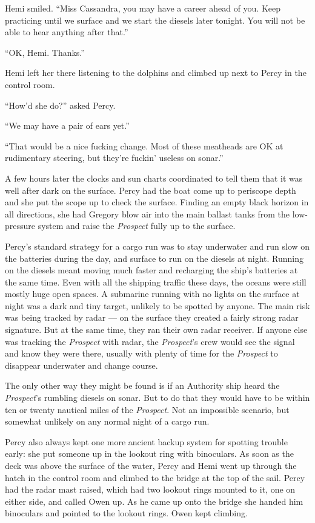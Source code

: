 \documentclass[
]{scrbook}
\begin{document}
Hemi smiled. ``Miss Cassandra, you may have a career ahead of you. Keep
practicing until we surface and we start the diesels later tonight. You
will not be able to hear anything after that.''

``OK, Hemi. Thanks.''

Hemi left her there listening to the dolphins and climbed up next to
Percy in the control room.

``How'd she do?'' asked Percy.

``We may have a pair of ears yet.''

``That would be a nice fucking change. Most of these meatheads are OK at
rudimentary steering, but they're fuckin' useless on sonar.''

\bigskip

A few hours later the clocks and sun charts coordinated to tell them
that it was well after dark on the surface. Percy had the boat come up
to periscope depth and she put the scope up to check the surface.
Finding an empty black horizon in all directions, she had Gregory blow
air into the main ballast tanks from the low-pressure system and raise
the \emph{Prospect} fully up to the surface.

Percy's standard strategy for a cargo run was to stay underwater and run
slow on the batteries during the day, and surface to run on the diesels
at night. Running on the diesels meant moving much faster and recharging
the ship's batteries at the same time. Even with all the shipping
traffic these days, the oceans were still mostly huge open spaces. A
submarine running with no lights on the surface at night was a dark and
tiny target, unlikely to be spotted by anyone. The main risk was being
tracked by radar --- on the surface they created a fairly strong radar
signature. But at the same time, they ran their own radar receiver. If
anyone else was tracking the \emph{Prospect} with radar, the
\emph{Prospect}'s crew would see the signal and know they were there,
usually with plenty of time for the \emph{Prospect} to disappear
underwater and change course.

The only other way they might be found is if an Authority ship heard the
\emph{Prospect}'s rumbling diesels on sonar. But to do that they would
have to be within ten or twenty nautical miles of the \emph{Prospect}.
Not an impossible scenario, but somewhat unlikely on any normal night of
a cargo run.

Percy also always kept one more ancient backup system for spotting
trouble early: she put someone up in the lookout ring with binoculars.
As soon as the deck was above the surface of the water, Percy and Hemi
went up through the hatch in the control room and climbed to the bridge
at the top of the sail. Percy had the radar mast raised, which had two
lookout rings mounted to it, one on either side, and called Owen up. As
he came up onto the bridge she handed him binoculars and pointed to the
lookout rings. Owen kept climbing.
\end{document}
